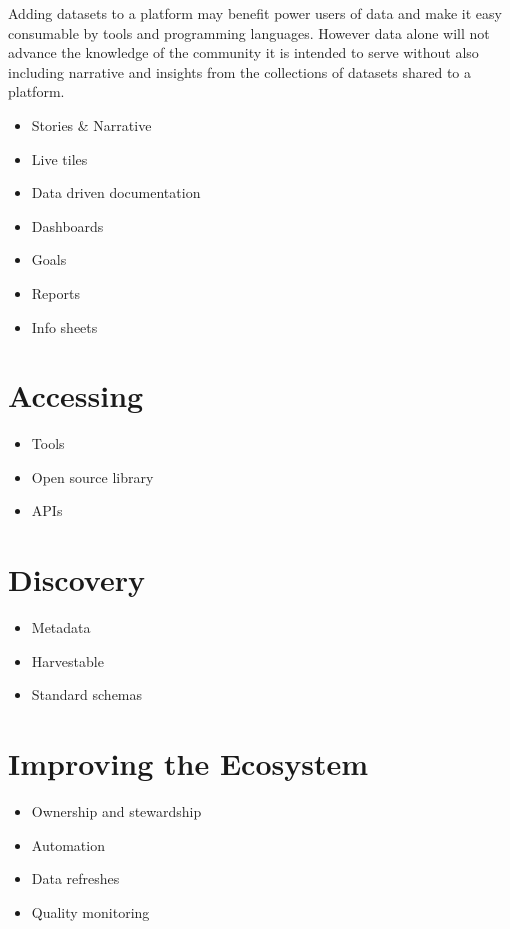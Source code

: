 \documentclass[
  openany]{book}
\providecommand{\tightlist}{%
  \setlength{\itemsep}{0pt}\setlength{\parskip}{0pt}}
\begin{document}
Adding datasets to a platform may benefit power users of data and make it easy consumable by tools and programming languages. However data alone will not advance the knowledge of the community it is intended to serve without also including narrative and insights from the collections of datasets shared to a platform.

\begin{itemize}
\tightlist
\item
  Stories \& Narrative
\item
  Live tiles
\item
  Data driven documentation
\item
  Dashboards
\item
  Goals
\item
  Reports
\item
  Info sheets
\end{itemize}

\hypertarget{accessing}{%
\section{Accessing}\label{accessing}}

\begin{itemize}
\tightlist
\item
  Tools
\item
  Open source library
\item
  APIs
\end{itemize}

\hypertarget{discovery}{%
\section{Discovery}\label{discovery}}

\begin{itemize}
\tightlist
\item
  Metadata
\item
  Harvestable
\item
  Standard schemas
\end{itemize}

\hypertarget{improving-the-ecosystem}{%
\section{Improving the Ecosystem}\label{improving-the-ecosystem}}

\begin{itemize}
\tightlist
\item
  Ownership and stewardship
\item
  Automation
\item
  Data refreshes
\item
  Quality monitoring
\end{itemize}

  
\end{document}
